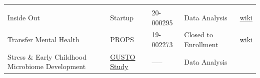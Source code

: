 \documentclass[]{book}
\begin{document}
\begin{longtable}[]{@{}lllll@{}}
\begin{minipage}[t]{0.10\columnwidth}
\end{minipage}\tabularnewline
\begin{minipage}[t]{0.32\columnwidth}\raggedright
Inside Out\strut
\end{minipage} & \begin{minipage}[t]{0.21\columnwidth}\raggedright
Startup\strut
\end{minipage} & \begin{minipage}[t]{0.13\columnwidth}\raggedright
20-000295\strut
\end{minipage} & \begin{minipage}[t]{0.10\columnwidth}\raggedright
Data Analysis\strut
\end{minipage} & \begin{minipage}[t]{0.10\columnwidth}\raggedright
\href{https://bablab.github.io/wiki_inside_out/}{wiki}\strut
\end{minipage}\tabularnewline
\begin{minipage}[t]{0.32\columnwidth}\raggedright
Transfer Mental Health\strut
\end{minipage} & \begin{minipage}[t]{0.21\columnwidth}\raggedright
PROPS\strut
\end{minipage} & \begin{minipage}[t]{0.13\columnwidth}\raggedright
19-002273\strut
\end{minipage} & \begin{minipage}[t]{0.10\columnwidth}\raggedright
Closed to Enrollment\strut
\end{minipage} & \begin{minipage}[t]{0.10\columnwidth}\raggedright
\href{https://bablab.github.io/wiki_transfer_mental_health/}{wiki}\strut
\end{minipage}\tabularnewline
\begin{minipage}[t]{0.32\columnwidth}\raggedright
Stress \& Early Childhood Microbiome Development\strut
\end{minipage} & \begin{minipage}[t]{0.21\columnwidth}\raggedright
\href{http://www.gusto.sg/}{GUSTO Study}\strut
\end{minipage} & \begin{minipage}[t]{0.13\columnwidth}\raggedright
-----\strut
\end{minipage} & \begin{minipage}[t]{0.10\columnwidth}\raggedright
Data Analysis\strut
\end{minipage} & \begin{minipage}[t]{0.10\columnwidth}\raggedright

\end{minipage}
\end{longtable}
\end{document}
